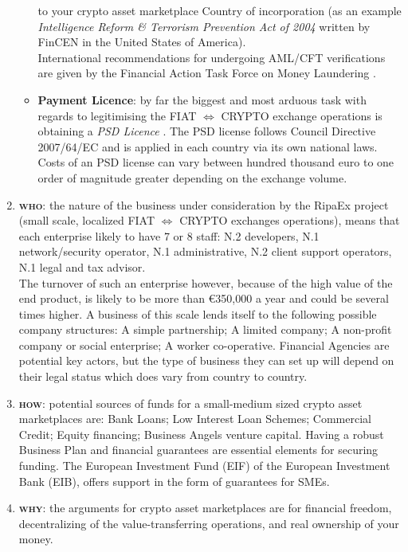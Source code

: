 \documentclass[11pt,fleqn]{book} %
\begin{document}
\begin{enumerate}
\begin{itemize}
			to your crypto asset marketplace Country of incorporation (as an example \textit{Intelligence Reform \& Terrorism Prevention Act of 2004}
			written by FinCEN in the United States of America).\\
			International recommendations for undergoing AML/CFT verifications are given by the Financial Action Task Force on Money Laundering \cite{FATF}.
			\item \textbf{Payment Licence}: by far the biggest and most arduous task with regards to legitimising the 
			FIAT $\Leftrightarrow$ CRYPTO exchange operations is obtaining a \textit{PSD Licence} \cite{PSD}. 
			The PSD license follows Council Directive 2007/64/EC and is applied in each country via its own national laws. 
			Costs of an PSD license can vary between hundred thousand euro to one order of magnitude greater depending on the exchange volume.
		\end{itemize}
	\item \textbf{\textsc{who}}: the nature of the business under consideration by the RipaEx project (small scale,
	localized FIAT $\Leftrightarrow$ CRYPTO exchanges operations), means that each enterprise likely to have 7 or 8 staff: N.2 developers, 
	N.1 network/security operator, N.1 administrative, N.2 client support operators, N.1 legal and tax advisor. \\
	The turnover of such an enterprise however, because of the high value of the end product, is likely to be more than 
	\euro 350,000 a year and could be several times higher. A business of
	this scale lends itself to the following possible company structures: A simple partnership;
	A limited company; A non-profit company or social enterprise; A worker co-operative.
	Financial Agencies are potential key actors, but the type of business they can set up will
	depend on their legal status which does vary from country to country.
	\item \textbf{\textsc{how}}: potential sources of funds for a small-medium sized crypto asset marketplaces are: Bank Loans; Low
	Interest Loan Schemes; Commercial Credit; Equity financing; Business Angels venture
	capital. Having a robust Business Plan and financial guarantees are essential elements
	for securing funding. The European Investment Fund (EIF) of the European Investment Bank (EIB), 
	offers support in the form of guarantees for SMEs.
	\item \textbf{\textsc{why}}: the arguments for crypto asset marketplaces are for financial freedom,
	decentralizing of the value-transferring operations, and real ownership of your money. 

\end{enumerate}
\end{document}

